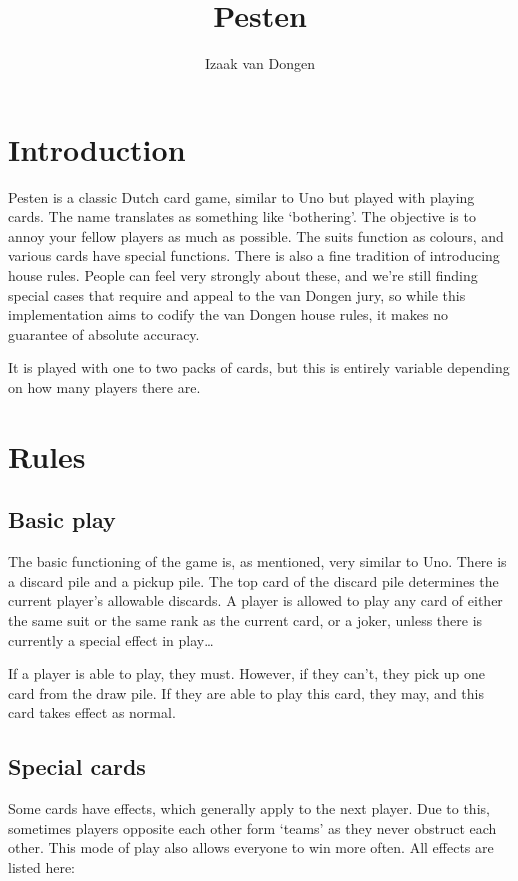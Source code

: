 \documentclass{article}
\title{Pesten}
\author{Izaak van Dongen}
\begin{document}
    \maketitle
    \tableofcontents
    \lstlistoflistings

    \section{Introduction}
    Pesten is a classic Dutch card game, similar to Uno but played with playing
    cards. The name translates as something like `bothering'. The objective is
    to annoy your fellow players as much as possible. The suits function as
    colours, and various cards have special functions. There is also a fine
    tradition of introducing house rules.  People can feel very strongly about
    these, and we're still finding special cases that require and appeal to the
    van Dongen jury, so while this implementation aims to codify the van Dongen
    house rules, it makes no guarantee of absolute accuracy.

    It is played with one to two packs of cards, but this is entirely variable
    depending on how many players there are.

    \section{Rules}
    \subsection{Basic play}
    The basic functioning of the game is, as mentioned, very similar to Uno.
    There is a discard pile and a pickup pile. The top card of the discard pile
    determines the current player's allowable discards. A player is allowed to
    play any card of either the same suit or the same rank as the current card,
    or a joker, unless there is currently a special effect in play\ldots

    If a player is able to play, they must. However, if they can't, they pick
    up one card from the draw pile. If they are able to play this card, they
    may, and this card takes effect as normal.

    \subsection{Special cards}

    Some cards have effects, which generally apply to the next player. Due to
    this, sometimes players opposite each other form `teams' as they never
    obstruct each other. This mode of play also allows everyone to win more
    often. All effects are listed here:
\end{document}
